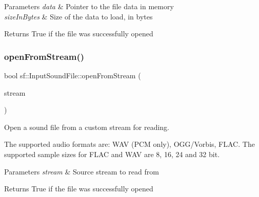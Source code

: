 \begin{DoxyParams}{Parameters}
{\em data} & Pointer to the file data in memory \\
\hline
{\em size\+In\+Bytes} & Size of the data to load, in bytes\\
\hline
\end{DoxyParams}
\begin{DoxyReturn}{Returns}
True if the file was successfully opened \begin{DoxyVerb}\end{DoxyVerb}
 
\end{DoxyReturn}
\mbox{\label{classsf_1_1_input_sound_file_a32b76497aeb088a2b46dc6efd819b909}} 
\subsubsection{\texorpdfstring{openFromStream()}{openFromStream()}}
{\footnotesize\ttfamily bool sf\+::\+Input\+Sound\+File\+::open\+From\+Stream (\begin{DoxyParamCaption}\item[{\mbox{\hyperlink{classsf_1_1_input_stream}{Input\+Stream}} \&}]{stream }\end{DoxyParamCaption})}



Open a sound file from a custom stream for reading. 

The supported audio formats are\+: W\+AV (P\+CM only), O\+G\+G/\+Vorbis, F\+L\+AC. The supported sample sizes for F\+L\+AC and W\+AV are 8, 16, 24 and 32 bit.


\begin{DoxyParams}{Parameters}
{\em stream} & Source stream to read from\\
\hline
\end{DoxyParams}
\begin{DoxyReturn}{Returns}
True if the file was successfully opened \begin{DoxyVerb}\end{DoxyVerb}
 
\end{DoxyReturn}
\mbox{\label{classsf_1_1_input_sound_file_a83d6f64617456601edeb0daf9d14a17f}} 
